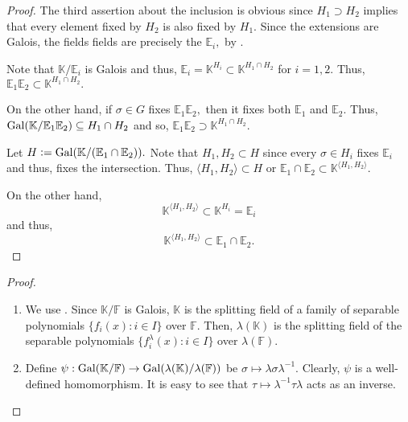 \galoissubgroupscompositum*\label{thm:galoissubgroupscompositum2}
\begin{flushright}\hyperref[thm:galoissubgroupscompositum]{\upsym}\end{flushright}
\begin{proof}
    The third assertion about the inclusion is obvious since $H_1 \supset H_2$ implies that every element fixed by $H_2$ is also fixed by $H_1.$ Since the extensions are Galois, the fields fields are precisely the $\mathbb{E}_i,$ by .

    Note that $\mathbb{K}/\mathbb{E}_i$ is Galois and thus, $\mathbb{E}_i = \mathbb{K}^{H_i} \subset \mathbb{K}^{H_1 \cap H_2}$ for $i = 1, 2.$ Thus, $\mathbb{E}_1\mathbb{E}_2 \subset \mathbb{K}^{H_1 \cap H_2}.$

    On the other hand, if $\sigma \in G$ fixes $\mathbb{E}_1\mathbb{E}_2,$ then it fixes both $\mathbb{E}_1$ and $\mathbb{E}_2.$ Thus, $\operatorname{Gal}(\mathbb{K}/\mathbb{E}_1\mathbb{E}_2) \subseteq H_1 \cap H_2$ and so, $\mathbb{E}_1\mathbb{E}_2 \supset \mathbb{K}^{H_1 \cap H_2}.$

    Let $H \vcentcolon= \operatorname{Gal}(\mathbb{K}/(\mathbb{E}_1 \cap \mathbb{E}_2)).$ Note that $H_1, H_2 \subset H$ since every $\sigma \in H_i$ fixes $\mathbb{E}_i$ and thus, fixes the intersection. Thus, $\langle H_1, H_2\rangle \subset H$ or $\mathbb{E}_1 \cap \mathbb{E}_2 \subset \mathbb{K}^{\langle H_1, H_2\rangle}.$

    On the other hand, 
    \begin{equation*} 
        \mathbb{K}^{\langle H_1, H_2\rangle} \subset \mathbb{K}^{H_i} = \mathbb{E}_i
    \end{equation*}
    and thus,
    \begin{equation*} 
        \mathbb{K}^{\langle H_1, H_2\rangle} \subset \mathbb{E}_1 \cap \mathbb{E}_2.
    \end{equation*}
\end{proof}

\isomorphismgalois*\label{prop:isomorphismgalois2}
\begin{flushright}\hyperref[prop:isomorphismgalois]{\upsym}\end{flushright}
\begin{proof}
    \phantom{hi}
    \begin{enumerate}
        \item We use . Since $\mathbb{K}/\mathbb{F}$ is Galois, $\mathbb{K}$ is the splitting field of a family of separable polynomials $\{f_i(x) : i \in I\}$ over $\mathbb{F}.$ Then, $\lambda(\mathbb{K})$ is the splitting field of the separable polynomials $\{f^{\lambda}_i(x) : i \in I\}$ over $\lambda(\mathbb{F}).$
        \item Define $\psi : \operatorname{Gal}(\mathbb{K}/\mathbb{F}) \to \operatorname{Gal}(\lambda(\mathbb{K})/\lambda(\mathbb{F}))$ be $\sigma \mapsto \lambda\sigma\lambda^{-1}.$ Clearly, $\psi$ is a well-defined homomorphism. It is easy to see that $\tau \mapsto \lambda^{-1}\tau\lambda$ acts as an inverse. \qedhere
    \end{enumerate}
\end{proof}

